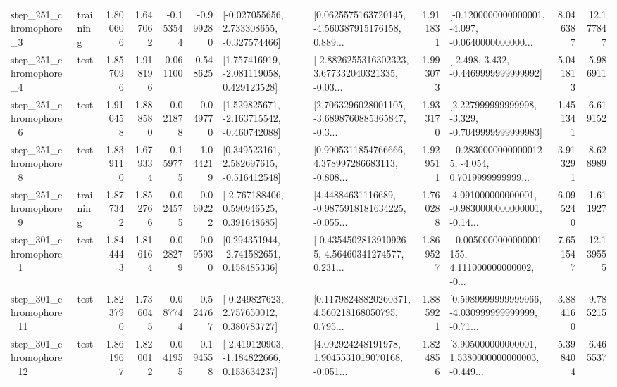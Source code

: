 \begin{tabular}{llrrrrllrlrr}
   step\_251\_chromophore\_3 &  training &      1.800606 &    1.647062 &     -0.153544 & -0.999280 &   [-0.027055656, 2.733308655, -0.327574466] &  [0.0625575163720145, -4.560387915176158, 0.889... &       1.911831 &  [-0.1200000000000001, -4.097, -0.0640000000000... &            8.046387 &         12.177847 \\
   step\_251\_chromophore\_4 &      test &      1.857096 &    1.918196 &      0.061100 &  0.548625 &    [1.757416919, -2.081119058, 0.429123528] &  [-2.8826255316302323, 3.677332040321335, -0.03... &       1.993073 &               [-2.498, 3.432, -0.4469999999999992] &            5.041813 &          5.986911 \\
   step\_251\_chromophore\_6 &      test &      1.910458 &    1.888580 &     -0.021878 & -0.049770 &   [1.529825671, -2.163715542, -0.460742088] &  [2.7063296028001105, -3.6898760885365847, -0.3... &       1.933170 &   [2.227999999999998, -3.329, -0.7049999999999983] &            1.451341 &          6.619152 \\
   step\_251\_chromophore\_8 &      test &      1.839110 &    1.679334 &     -0.159775 & -1.044219 &    [0.349523161, 2.582697615, -0.516412548] &  [0.9905311854766666, 4.378997286683113, -0.808... &       1.929511 &  [-0.28300000000000125, -4.054, 0.7019999999999... &            3.913291 &          8.628989 \\
   step\_251\_chromophore\_9 &  training &      1.877342 &    1.852766 &     -0.024575 & -0.069222 &    [-2.767188406, 0.590946525, 0.391648685] &  [4.44884631116689, -0.9875918181634225, -0.055... &       1.760288 &  [4.091000000000001, -0.9830000000000001, -0.14... &            6.095240 &          1.611927 \\
   step\_301\_chromophore\_1 &      test &      1.844443 &    1.816164 &     -0.028279 & -0.095930 &    [0.294351944, -2.741582651, 0.158485336] &  [-0.43545028139109265, 4.56460341274577, 0.231... &       1.869527 &  [-0.0050000000000001155, 4.111000000000002, -0... &            7.651547 &         12.139555 \\
  step\_301\_chromophore\_11 &      test &      1.823790 &    1.736045 &     -0.087744 & -0.524767 &    [-0.249827623, 2.757650012, 0.380783727] &  [0.11798248820260371, 4.560218168050795, 0.795... &       1.885921 &  [0.5989999999999966, -4.030999999999999, -0.71... &            3.884160 &          9.785215 \\
  step\_301\_chromophore\_12 &      test &      1.861967 &    1.820012 &     -0.041955 & -0.194558 &   [-2.419120903, -1.184822666, 0.153634237] &  [4.092924248191978, 1.9045531019070168, -0.051... &       1.824856 &  [3.905000000000001, 1.5380000000000003, -0.449... &            5.398404 &          6.465537 \\

\end{tabular}
